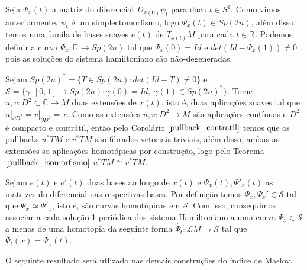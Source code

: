 \documentclass[12pt]{book}
\newcommand{\real}[1]{\mathbb{R}^{#1}}
\newcommand{\solucoesperiodicascontrateis}{\mathcal{L}M}
\newcommand{\vermelho}[1]{{\color{red}#1}}
\begin{document}
	Seja $\Psi_{x}(t)$ a matriz do diferencial $D_{x(0)}\psi_{t}$ para daca $t\in S^{1}$. Como vimos anteriormente, $\psi_{t}$ é um simplectomorfismo, logo $\Psi_{x}(t) \in Sp(2n)$, além disso, temos uma famíla de bases suaves $e(t)$ de $T_{x(t)}M$ para cada $t \in \real{}$. Podemos definir a curva $\Psi_{x}:\real{} \to Sp(2n)$ tal que $\Psi_{x}(0) = Id$ e $det(Id-\Psi_{x}(1)) \neq 0$ pois as soluções do sistema hamiltoniano são não-degeneradas.
	
	Sejam $Sp(2n)^{*} = \{T\in Sp(2n): det(Id-T) \neq 0\}$ e $\mathcal{S} = \{\gamma:[0,1] \to Sp(2n): \gamma(0) = Id,\; \gamma(1)\in Sp(2n)^{*} \}$. Tome $u,v : D^{2} \subset \mathbb{C} \to M$ duas extensões de $x(t)$, isto é, duas aplicações suaves tal que $u|_{\partial D^{2}} = v|_{\partial D^{2}} = x$. Como as extensões $u,v:D^{2} \to M$ são aplicações contínuas e $D^{2}$ é compacto e contrátil, então pelo Corolário $\ref{pullback_contratil}$ temos que os pullbacks $u^{*}TM$ e $v^{*}TM$ são fibrados vetoriais triviais, além disso, ambas as extensões so aplicações homotópicas por construção, logo pelo Teorema $\ref{pullback_isomorfismo}$  $u^{*}TM \cong v^{*}TM$.
	
	Sejam $e(t)$ e $e'(t)$ duas bases ao longo de $x(t)$ e $\Psi_{x}(t), \Psi'_{x}(t)$ as matrizes do diferencial nas respectivas bases. Por definição temos $\Psi_{x}, \Psi_{x}' \in \mathcal{S}$ tal que $\Psi_{x} \simeq \Psi'_{x}$, isto é, \vermelho{são curvas homotópicas em $\mathcal{S}$}. Com isso, consequimos associar a cada solução 1-periódica dos sistema Hamiltoniano a uma curva $\Psi_{x} \in \mathcal{S}$ a menos de uma homotopia da seguinte forma $\hat{\Psi}_{t}:\solucoesperiodicascontrateis \to \mathcal{S}$ tal que $\hat{\Psi}_{t}(x) = \Psi_{x}(t)$.
	
	O seguinte resultado será utlizado nas demais construções do índice de Maslov.
	
\end{document}

